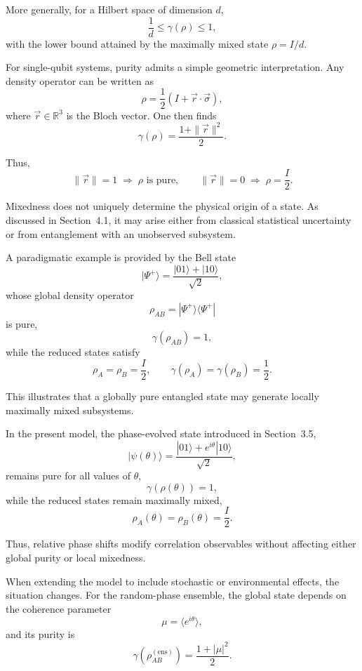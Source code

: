 \documentclass[a4paper]{article}
\begin{document}
More generally, for a Hilbert space of dimension \( d \),
\[
\frac{1}{d} \le \gamma(\rho) \le 1,
\]
with the lower bound attained by the maximally mixed state \( \rho = I/d \).

\medskip

For single-qubit systems, purity admits a simple geometric interpretation. Any density operator can be written as
\[
\rho = \frac{1}{2}\left(I + \vec{r} \cdot \vec{\sigma}\right),
\]
where \( \vec{r} \in \mathbb{R}^3 \) is the Bloch vector. One then finds
\[
\gamma(\rho) = \frac{1 + \|\vec{r}\|^2}{2}.
\]

Thus,
\[
\|\vec{r}\| = 1 \;\Rightarrow\; \rho \text{ is pure}, 
\qquad
\|\vec{r}\| = 0 \;\Rightarrow\; \rho = \frac{I}{2}.
\]

\medskip

Mixedness does not uniquely determine the physical origin of a state. As discussed in Section~4.1, it may arise either from classical statistical uncertainty or from entanglement with an unobserved subsystem.

\medskip

A paradigmatic example is provided by the Bell state
\[
|\Psi^+\rangle = \frac{|01\rangle + |10\rangle}{\sqrt{2}},
\]
whose global density operator
\[
\rho_{AB} = |\Psi^+\rangle \langle \Psi^+|
\]
is pure,
\[
\gamma(\rho_{AB}) = 1,
\]
while the reduced states satisfy
\[
\rho_A = \rho_B = \frac{I}{2}, 
\qquad
\gamma(\rho_A) = \gamma(\rho_B) = \frac{1}{2}.
\]

This illustrates that a globally pure entangled state may generate locally maximally mixed subsystems.

\medskip

In the present model, the phase-evolved state introduced in Section~3.5,
\[
|\psi(\theta)\rangle = \frac{|01\rangle + e^{i\theta}|10\rangle}{\sqrt{2}},
\]
remains pure for all values of \( \theta \),
\[
\gamma(\rho(\theta)) = 1,
\]
while the reduced states remain maximally mixed,
\[
\rho_A(\theta) = \rho_B(\theta) = \frac{I}{2}.
\]

Thus, relative phase shifts modify correlation observables without affecting either global purity or local mixedness.

\medskip

When extending the model to include stochastic or environmental effects, the situation changes. For the random-phase ensemble, the global state depends on the coherence parameter
\[
\mu = \langle e^{i\theta} \rangle,
\]
and its purity is
\[
\gamma\!\left(\rho_{AB}^{(\mathrm{ens})}\right)
=
\frac{1 + |\mu|^2}{2}.
\]
\end{document}
